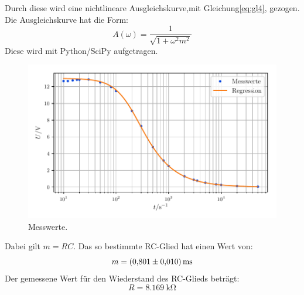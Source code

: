 Durch diese wird eine nichtlineare Ausgleichskurve,mit Gleichung\eqref{eq:gl4}, gezogen.
Die Ausgleichskurve hat die Form:
\begin{equation}
  A(\omega)= \frac{1}{\sqrt{1+\omega^2 m^2}}
\end{equation}
Diese wird mit Python/SciPy aufgetragen.
\begin{figure}[H]
    \centering
    \includegraphics[width=\textwidth]{build/messung2.pdf}
    \caption{Messwerte.}
    \label{fig:plot2}
\end{figure}
\noindent Dabei gilt $m=RC$.
Das so bestimmte RC-Glied hat einen Wert von:
\begin{equation*}
  m = \SI{0.801\pm0.01}{\milli\second}
\end{equation*}
Der gemessene Wert für den Wiederstand des RC-Glieds beträgt:
\begin{equation}
  R = \SI{8.169}{\kilo\ohm}
\end{equation}
%

